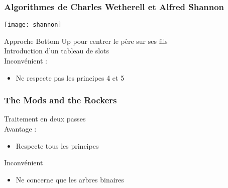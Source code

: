 \begin{frame}
	\frametitle{Algorithmes de Charles Wetherell et Alfred Shannon}
	\begin{center}
	\texttt{[image: shannon]}
	\end{center}
	Approche Bottom Up pour centrer le père sur ses fils\\
	Introduction d'un tableau de slots\\
	Inconvénient :
	\begin{itemize}
		\item Ne respecte pas les principes 4 et 5
	\end{itemize}
\end{frame}

\begin{frame}
	\frametitle{The Mods and the Rockers}
	Traitement en deux passes\\
	Avantage :
	\begin{itemize}
		\item Respecte tous les principes
	\end{itemize}
	Inconvénient
	\begin{itemize}
		\item Ne concerne que les arbres binaires
	\end{itemize}
\end{frame}

